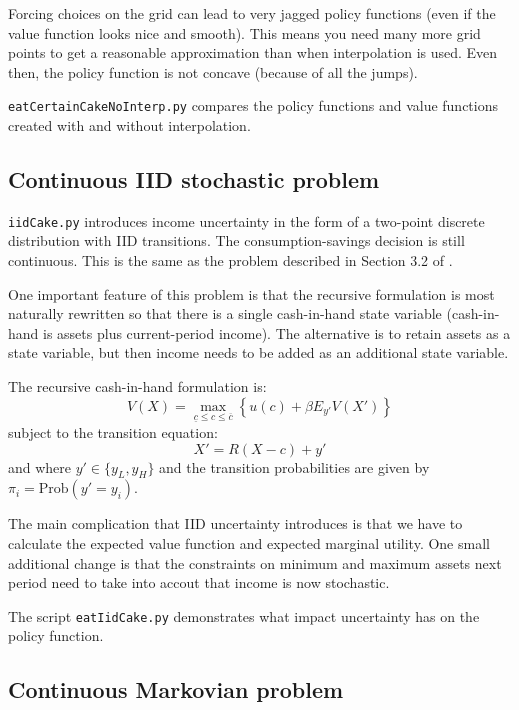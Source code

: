 Forcing choices on the grid can lead to very jagged policy functions (even if the value function looks nice and smooth). This means you need many more grid points to get a reasonable approximation than when interpolation is used. Even then, the policy function is not concave (because of all the jumps).

\texttt{eatCertainCakeNoInterp.py} compares the policy functions and value functions created with and without interpolation.

\subsection{Continuous IID stochastic problem}

\texttt{iidCake.py} introduces income uncertainty in the form of a two-point discrete distribution with IID transitions. The consumption-savings decision is still continuous. This is the same as the problem described in Section 3.2 of \citet{adda2003dynamic}.

One important feature of this problem is that the recursive formulation is most naturally rewritten so that there is a single cash-in-hand state variable (cash-in-hand is assets plus current-period income). The alternative is to retain assets as a state variable, but then income needs to be added as an additional state variable.

The recursive cash-in-hand formulation is:
\begin{equation}
	V(X) = \max_{\underline{c} \leq c \leq \overline{c}} \left\{ u(c) + \beta E_{y'} V(X') \right\}
\end{equation}
subject to the transition equation:
\begin{equation}
	X' = R (X - c) + y'
\end{equation}
and where \(y' \in \{y_L, y_H\}\) and the transition probabilities are given by \(\pi_{i} = \text{Prob}(y' = y_i)\).

The main complication that IID uncertainty introduces is that we have to calculate the expected value function and expected marginal utility. One small additional change is that the constraints on minimum and maximum assets next period need to take into accout that income is now stochastic.

The script \texttt{eatIidCake.py} demonstrates what impact uncertainty has on the policy function.

\subsection{Continuous Markovian problem}


